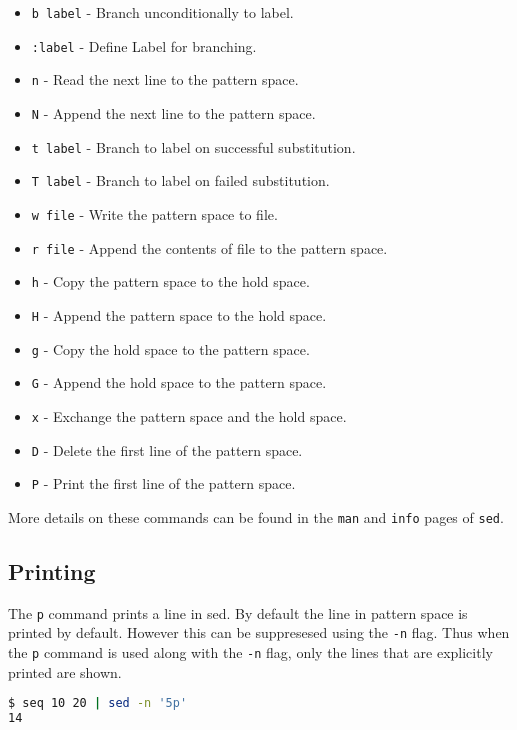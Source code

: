\begin{itemize}
  \item \lstinline|b label| - Branch unconditionally to label.
  \item \lstinline|:label| - Define Label for branching.
  \item \lstinline|n| - Read the next line to the pattern space.
  \item \lstinline|N| - Append the next line to the pattern space.
  \item \lstinline|t label| - Branch to label on successful substitution.
  \item \lstinline|T label| - Branch to label on failed substitution.
  \item \lstinline|w file| - Write the pattern space to file.
  \item \lstinline|r file| - Append the contents of file to the pattern space.
  \item \lstinline|h| - Copy the pattern space to the hold space.
  \item \lstinline|H| - Append the pattern space to the hold space.
  \item \lstinline|g| - Copy the hold space to the pattern space.
  \item \lstinline|G| - Append the hold space to the pattern space.
  \item \lstinline|x| - Exchange the pattern space and the hold space.
  \item \lstinline|D| - Delete the first line of the pattern space.
  \item \lstinline|P| - Print the first line of the pattern space.
\end{itemize}

More details on these commands can be found in the \lstinline|man| and \lstinline|info| pages of \lstinline|sed|.

\subsection{Printing}

The \lstinline|p| command prints a line in sed.
By default the line in pattern space is printed by default.
However this can be suppresesed using the \lstinline|-n| flag.
Thus when the \lstinline|p| command is used along with the \lstinline|-n| flag, only the lines that are explicitly printed are shown.

\begin{lstlisting}[language=bash]
$ seq 10 20 | sed -n '5p'
14
\end{lstlisting}

